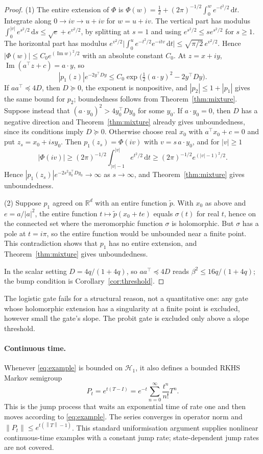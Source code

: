 \documentclass[11pt,a4paper]{article}
\theoremstyle{remark}
\newcommand{\R}{\mathbb R}
\newcommand{\HH}{\mathcal H}
\newcommand{\dd}{\,\mathrm d}
\newcommand{\norm}[1]{\left\lVert#1\right\rVert}
\newcommand{\im}{\operatorname{Im}}
\begin{document}
\begin{proof}
(1) The entire extension of $\Phi$ is
$\Phi(w)=\tfrac12+(2\pi)^{-1/2}\int_0^we^{-t^2/2}\dd t$. Integrate
along $0\to iv\to u+iv$ for $w=u+iv$. The vertical part has modulus
$\int_0^{|v|}e^{s^2/2}\dd s\le\sqrt e+e^{v^2/2}$, by splitting at
$s=1$ and using $e^{s^2/2}\le se^{s^2/2}$ for $s\ge1$. The horizontal
part has modulus
$e^{v^2/2}\bigl|\int_0^ue^{-t^2/2}e^{-itv}\dd t\bigr|\le
\sqrt{\pi/2}\,e^{v^2/2}$. Hence $|\Phi(w)|\le C_0e^{(\im w)^2/2}$ with an
absolute constant $C_0$. At $z=x+iy$, $\im(a^\top z+c)=a\cdot y$, so
\[
 |p_1(z)|e^{-2y^\top Dy}\le C_0\exp\bigl(\tfrac12(a\cdot y)^2-2y^\top
 Dy\bigr).
\]
If $aa^\top\preceq4D$, then $D\succeq0$, the exponent is nonpositive,
and $|p_2|\le1+|p_1|$ gives the same bound for $p_2$; boundedness
follows from Theorem~\ref{thm:mixture}. Suppose instead that
$(a\cdot y_0)^2>4y_0^\top Dy_0$ for some $y_0$. If $a\cdot y_0=0$, then
$D$ has a negative direction and Theorem~\ref{thm:mixture} already gives
unboundedness, since its conditions imply $D\succeq0$. Otherwise choose real $x_0$ with
$a^\top x_0+c=0$ and put $z_s=x_0+isy_0$. Then $p_1(z_s)=\Phi(iv)$ with
$v=s\,a\cdot y_0$, and for $|v|\ge1$
\[
 |\Phi(iv)|\ge(2\pi)^{-1/2}\int_{|v|-1}^{|v|}e^{t^2/2}\dd t
 \ge(2\pi)^{-1/2}e^{(|v|-1)^2/2}.
\]
Hence $|p_1(z_s)|e^{-2s^2y_0^\top Dy_0}\to\infty$ as $s\to\infty$, and
Theorem~\ref{thm:mixture} gives unboundedness.

(2) Suppose $p_1$ agreed on $\R^d$ with an entire function $\tilde p$.
With $x_0$ as above and $e=a/|a|^2$, the entire function
$t\mapsto\tilde p(x_0+te)$ equals $\sigma(t)$ for real $t$, hence on the
connected set where the meromorphic function $\sigma$ is holomorphic.
But $\sigma$ has a pole at $t=i\pi$, so the entire function would be
unbounded near a finite point. This contradiction shows that $p_1$ has
no entire extension, and Theorem~\ref{thm:mixture} gives unboundedness.

In the scalar setting $D=4q/(1+4q)$, so $aa^\top\preceq4D$ reads
$\beta^2\le16q/(1+4q)$; the bump condition is
Corollary~\ref{cor:threshold}.
\end{proof}

The logistic gate fails for a structural reason, not a quantitative
one: any gate whose holomorphic extension has a singularity at a finite
point is excluded, however small the gate's slope. The probit gate is
excluded only above a slope threshold.

\paragraph{Continuous time.}
Whenever \eqref{eq:example} is bounded on $\HH_1$, it also
defines a bounded RKHS Markov semigroup
\[
 P_t=e^{t(T-I)}
     =e^{-t}\sum_{n=0}^{\infty}\frac{t^n}{n!}T^n .
\]
This is the jump process that waits an exponential time of rate one and
then moves according to \eqref{eq:example}. The series converges in
operator norm and $\norm{P_t}\le e^{t(\norm T-1)}$. This standard
uniformisation argument supplies nonlinear continuous-time examples with
a constant jump rate; state-dependent jump rates are not covered.
\end{document}
